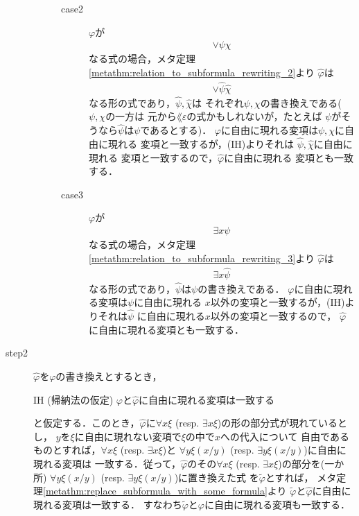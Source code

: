 \begin{metaprf}
\begin{description}
\begin{description}
\begin{description}
							\item[case2] $\varphi$が
								\begin{align}
									\vee \psi \chi
								\end{align}
								なる式の場合，メタ定理
								\ref{metathm:relation_to_subformula_rewriting_2}より
								$\widehat{\varphi}$は
								\begin{align}
									\vee \widehat{\psi} \widehat{\chi}
								\end{align}
								なる形の式であり，$\widehat{\psi},\widehat{\chi}$は
								それぞれ$\psi,\chi$の書き換えである($\psi,\chi$の一方は
								元から$\lang{\varepsilon}$の式かもしれないが，たとえば
								$\psi$がそうなら$\widehat{\psi}$は$\psi$であるとする)．
								$\varphi$に自由に現れる変項は$\psi,\chi$に自由に現れる
								変項と一致するが，(IH)よりそれは
								$\widehat{\psi},\widehat{\chi}$に自由に現れる
								変項と一致するので，$\widehat{\varphi}$に自由に現れる
								変項とも一致する．
					
							\item[case3] $\varphi$が
								\begin{align}
									\exists x \psi
								\end{align}
								なる式の場合，メタ定理
								\ref{metathm:relation_to_subformula_rewriting_3}より
								$\widehat{\varphi}$は
								\begin{align}
									\exists x \widehat{\psi}
								\end{align}
								なる形の式であり，$\widehat{\psi}$は$\psi$の書き換えである．
								$\varphi$に自由に現れる変項は$\psi$に自由に現れる
								$x$以外の変項と一致するが，(IH)よりそれは$\widehat{\psi}$
								に自由に現れる$x$以外の変項と一致するので，
								$\widehat{\varphi}$に自由に現れる変項とも一致する．
								\QED
						\end{description}
				\end{description}
			
			\item[step2]
				$\widehat{\varphi}$を$\varphi$の書き換えとするとき，
				\begin{itembox}[l]{IH (帰納法の仮定)}
					$\varphi$と$\widehat{\varphi}$に自由に現れる変項は一致する
				\end{itembox}
				と仮定する．このとき，$\widehat{\varphi}$に$\forall x \xi$ 
				(resp. $\exists x \xi$)の形の部分式が現れているとし，
				$y$を$\xi$に自由に現れない変項で$\xi$の中で$x$への代入について
				自由であるものとすれば，$\forall x \xi$ (resp. $\exists x \xi$)と
				$\forall y \xi(x/y)$ (resp. $\exists y \xi(x/y)$)に自由に現れる変項は
				一致する．従って，$\widehat{\varphi}$のその$\forall x \xi$ 
				(resp. $\exists x \xi$)の部分を(一か所)
				$\forall y \xi(x/y)$ (resp. $\exists y \xi(x/y)$)に置き換えた式
				を$\widetilde{\varphi}$とすれば，
				メタ定理\ref{metathm:replace_subformula_with_some_formula}より
				$\widetilde{\varphi}$と$\widehat{\varphi}$に自由に現れる変項は一致する．
				すなわち$\widetilde{\varphi}$と$\varphi$に自由に現れる変項も一致する．
				\QED
		\end{description}
	\end{metaprf}